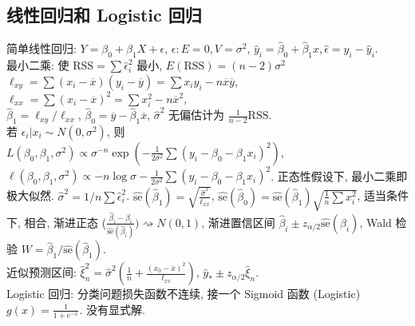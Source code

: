 \documentclass[a4paper, landscape,10pt]{article}
\begin{document}
\begin{multicols}{4}
\section{线性回归和 Logistic 回归}
简单线性回归: $Y = \beta_0 + \beta_1 X + \epsilon$, $\epsilon : E=0, V=\sigma^2$,
$\hat y_i = \hat \beta_0 + \hat \beta_1 x, \hat \epsilon = y_i - \hat y_i$.\\
最小二乘: 使 $\mathrm{RSS} = \sum \hat \epsilon_i^2$ 最小, $E(\mathrm{RSS}) = (n - 2)\sigma^2$ \\
$\ell_{xy}= \sum (x_i - \overline x)(y_i - \overline y) = \sum x_i y_i - n \overline x \overline y$, \\
$\ell_{xx} = \sum (x_i - \overline x)^2 = \sum x_i^2 - n \overline x^2$, \\
$\hat \beta_1 = \ell_{xy} / \ell_{xx}$, $\hat \beta_0 = \overline y - \hat \beta_1 \overline x$, $\hat \sigma ^ 2$ 无偏估计为 $\frac{1}{n - 2} \mathrm{RSS}$. \\
若 $\epsilon_i | x_i \sim N(0, \sigma^2)$, 则 \\
$L(\beta_0, \beta_1, \sigma^2) \propto \sigma^{-n} \exp \left( - \frac{1}{2\sigma^2} \sum (y_i - \beta_0 - \beta_1 x_i)^2 \right)$,
$\ell(\beta_0, \beta_1, \sigma^2) \propto -n \log \sigma - \frac{1}{2\sigma^2} \sum (y_i - \beta_0 - \beta_1 x_i)^2$.
正态性假设下, 最小二乘即极大似然. $\hat \sigma^2 = 1/n \sum \hat \epsilon_i^2$.
$\hat {\mathrm{se}}(\hat \beta_1) = \sqrt{\frac{\hat \sigma^2}{\ell_{xx}}}$,
$\hat {\mathrm{se}}(\hat \beta_0) = \hat {\mathrm{se}}(\hat \beta_1) \sqrt{\frac{1}{n} \sum x_i^2}$,
适当条件下, 相合, 渐进正态 ($\frac{\hat \beta_i - \beta_i}{\hat{\mathrm{se}}(\hat\beta_i)}) \rightsquigarrow N(0, 1)$,
渐进置信区间 $\hat \beta_i \pm z_{\alpha/2} \hat{\mathrm{se}}(\hat\beta_i)$, Wald 检验 $W=\hat \beta_1 / \hat{\mathrm{se}}(\hat\beta_1)$. \\
近似预测区间: $\hat \xi_n^2 = \hat \sigma^2 \left( \frac{1}{n} + \frac{(x_0 - \overline x)^2}{\ell_{xx}} \right)$, $\hat y_* \pm z_{\alpha/2} \hat \xi_n$. \\
Logistic 回归: 分类问题损失函数不连续, 接一个 Sigmoid 函数 (Logistic) $g(x) = \frac{1}{1 + e^{-x}}$. 没有显式解. \\
\end{multicols}
	
\end{document}
